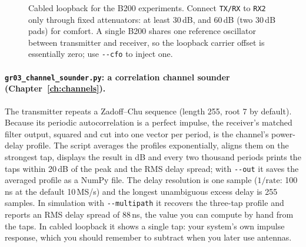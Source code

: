 \begin{figure}[htbp]\centering
{}
\caption{Cabled loopback for the B200 experiments. Connect \texttt{TX/RX} to \texttt{RX2} only through
fixed attenuators: at least 30\,dB, and 60\,dB (two 30\,dB pads) for comfort. A single B200 shares one
reference oscillator between transmitter and receiver, so the loopback carrier offset is essentially
zero; use \texttt{-{}-cfo} to inject one.}
\label{fig:appB_loopback}
\end{figure}

\paragraph{\texttt{gr03\_channel\_sounder.py}: a correlation channel sounder
(Chapter~\ref{ch:channels}).} The transmitter repeats a Zadoff--Chu sequence (length 255, root 7 by
default). Because its periodic autocorrelation is a perfect impulse, the receiver's matched filter
output, squared and cut into one vector per period, is the channel's power-delay profile. The script
averages the profiles exponentially, aligns them on the strongest tap, displays the result in dB and
every two thousand periods prints the taps within 20\,dB of the peak and the RMS delay spread; with
\texttt{-{}-out} it saves the averaged profile as a NumPy file. The delay resolution is one sample
($1/\text{rate}$: 100\,ns at the default 10\,MS/s) and the longest unambiguous excess delay is 255
samples. In simulation with \texttt{-{}-multipath} it recovers the three-tap profile and reports an RMS
delay spread of 88\,ns, the value you can compute by hand from the taps. In cabled loopback it shows a
single tap: your system's own impulse response, which you should remember to subtract when you
later use antennas.

